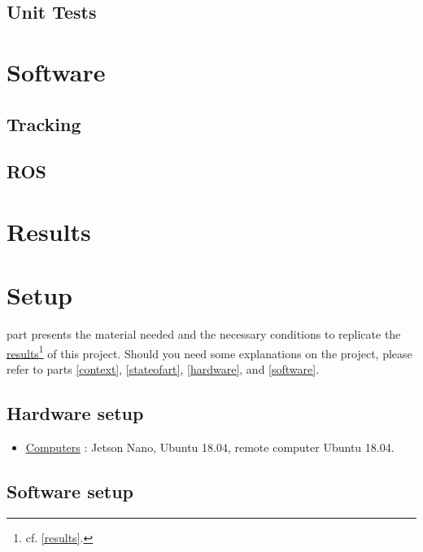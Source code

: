 	\section{Unit Tests}




\chapter{Software}\label{software}

	\section{Tracking}\label{tracking}
	
	\section{ROS}\label{ros}
	
\chapter{Results}\label{results}

\chapter{Setup}\label{setup}

	 part presents the material needed and the 
	necessary conditions to replicate the \hyperref[results]{results}\footnote{cf. \vref{results}.} of
	this project. Should you need some explanations on the project, please
	refer to parts \vref{context}, \vref{stateofart}, \vref{hardware}, and \vref{software}.

	\section{Hardware setup}

	
	\begin{itemize}
		\item [\ding{55}] \underline{Computers} : Jetson Nano, Ubuntu 18.04, remote computer Ubuntu 18.04. 
	\end{itemize}
	
	
	\section{Software setup}
